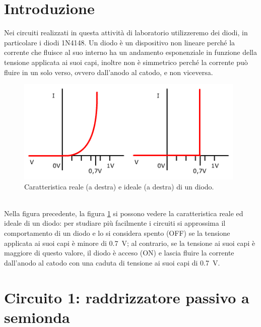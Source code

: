 \documentclass{report}
\begin{document}
\section*{Introduzione}
Nei circuiti realizzati in questa attività di laboratorio utilizzeremo dei diodi, in particolare i diodi 1N4148. Un diodo è un dispositivo non lineare perché la corrente che fluisce al suo interno ha un andamento esponenziale in funzione della tensione applicata ai suoi capi, inoltre non è simmetrico perché la corrente può fluire in un solo verso, ovvero dall'anodo al catodo, e non viceversa.
\begin{figure}[h]
	\centering
	\includegraphics[height=5cm]{immagini/diodo}
	\caption{Caratteristica reale (a destra) e ideale (a destra) di un diodo.}
	\label{figura:diodo}
\end{figure}
\\Nella figura precedente, la figura \ref{figura:diodo} si possono vedere la caratteristica reale ed ideale di un diodo: per studiare più facilmente i circuiti si approssima il comportamento di un diodo e lo si considera spento (OFF) se la tensione applicata ai suoi capi è minore di \SI{0.7}{\volt}; al contrario, se la tensione ai suoi capi è maggiore di questo valore, il diodo è acceso (ON) e lascia fluire la corrente dall'anodo al catodo con una caduta di tensione ai suoi capi di \SI{0.7}{\volt}.
\newpage
\section{Circuito 1: raddrizzatore passivo a semionda}
\end{document}
